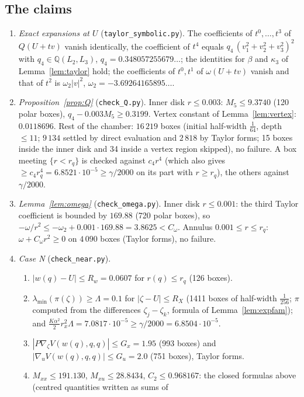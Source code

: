 \documentclass[11pt]{article}
\theoremstyle{definition}
\numberwithin{equation}{section}
\newcommand{\Azero}{2000}
\begin{document}
\subsection{The claims}
\begin{enumerate}[label=(C\arabic*),leftmargin=3em]
\item \emph{Exact expansions at $U$} (\texttt{taylor\_symbolic.py}). The coefficients of $t^0,\dots,t^3$ of $Q(U+tv)$ vanish identically,
the coefficient of $t^4$ equals $q_4\,(v_1^2+v_2^2+v_3^2)^2$ with $q_4\in\mathbb Q(L_2,L_3)$, $q_4=0.348057255679\ldots$; the identities for
$\beta$ and $\kappa_3$ of Lemma~\ref{lem:taylor} hold; the coefficients of $t^0,t^1$ of $\omega(U+tv)$ vanish and that of $t^2$ is
$\omega_2|v|^2$, $\omega_2=-3.69264165895\ldots$.
\item \emph{Proposition~\ref{prop:Q}} (\texttt{check\_Q.py}). Inner disk $r\le0.003$: $M_5\le9.3740$ (120 polar boxes), $q_4-0.003M_5\ge0.3199$.
Vertex constant of Lemma~\ref{lem:vertex}: $0.0118696$. Rest of the chamber: $16\,219$ boxes (initial half-width $\frac1{64}$, depth
$\le11$; $9\,134$ settled by direct evaluation and $2\,818$ by Taylor forms; 15 boxes inside the inner disk and 34 inside a vertex region
skipped), no failure. A box meeting $\{r<r_q\}$ is checked against $c_4r^4$ (which also gives $\ge c_4r_q^4=6.8521\cdot10^{-5}\ge\gamma/\Azero$
on its part with $r\ge r_q$), the others against $\gamma/\Azero$.
\item \emph{Lemma~\ref{lem:omega}} (\texttt{check\_omega.py}). Inner disk $r\le0.001$: the third Taylor coefficient is bounded by $169.88$
(720 polar boxes), so $-\omega/r^2\le-\omega_2+0.001\cdot169.88=3.8625<C_\omega$. Annulus $0.001\le r\le r_q$: $\omega+C_\omega r^2\ge0$ on
$4\,090$ boxes (Taylor forms), no failure.
\item \emph{Case N} (\texttt{check\_near.py}).
\begin{enumerate}[label=(\arabic*),leftmargin=1.8em]
\item $|w(q)-U|\le R_w=0.0607$ for $r(q)\le r_q$ (126 boxes).
\item $\lambda_{\min}(\pi(\zeta))\ge\Lambda=0.1$ for $|\zeta-U|\le R_X$ (1411 boxes of half-width $\frac1{256}$; $\pi$ computed from the
differences $\zeta_j-\zeta_k$, formula of Lemma~\ref{lem:expfam}); and $\frac{K\alpha^2}2r_x^2\Lambda=7.0817\cdot10^{-5}\ge\gamma/\Azero=6.8504\cdot10^{-5}$.
\item $|P\nabla_\zeta V(w(q),q,q)|\le G_x=1.95$ (993 boxes) and $|\nabla_uV(w(q),q,q)|\le G_u=2.0$ (751 boxes), Taylor forms.
\item $M_{xx}\le191.130$, $M_{xu}\le28.8434$, $C_2\le0.968167$: the closed formulas above (centred quantities written as sums of

\end{enumerate}
\end{enumerate}
\end{document}
